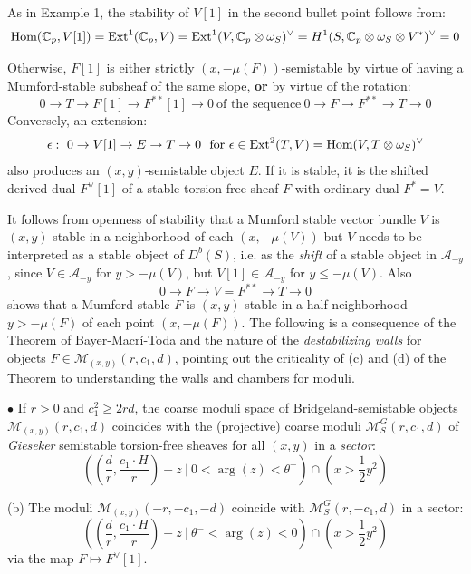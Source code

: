 \documentclass{amsart}
\begin{document}
As in Example 1, the stability of $V[1]$ in the second bullet point follows from:
\[ \mbox{Hom}({\mathbb C}_p, V[1]) = \mbox{Ext}^1({\mathbb C}_p,V) = \mbox{Ext}^1(V, {\mathbb C}_p \otimes \omega_S)^\vee = H^1(S, {\mathbb C}_p \otimes \omega_S \otimes V^*)^\vee = 0 \] 

Otherwise, $F[1]$ is either strictly $(x,-\mu(F))$-semistable by virtue of having a Mumford-stable subsheaf of the same slope, {\bf or} by 
virtue of the rotation:
\[ 0 \rightarrow T \rightarrow F[1] \rightarrow F^{**}[1] \rightarrow 0  \ \mbox{of the sequence} \  0 \rightarrow F \rightarrow F^{**} \rightarrow T \rightarrow 0 \]  
Conversely, an extension:
\[ \epsilon: \ 0 \rightarrow V[1] \rightarrow E \rightarrow T \rightarrow 0 \ \ \mbox{for} \ \epsilon \in \Ext^ 2(T,V) = \Hom(V,T \otimes \omega_S)^\vee \] 
also produces an $(x,y)$-semistable object $E$. 
If it is  stable, it is the shifted derived dual  $F^\vee[1]$ of a stable torsion-free sheaf $F$ with ordinary dual $F^* = V$. 

\medskip

It follows from openness of stability that a Mumford stable vector bundle $V$ is 
$(x,y)$-stable in a neighborhood of each $(x, -\mu(V))$ 
but $V$ needs to be interpreted as a stable object of $D^b(S)$, i.e. as the  {\it shift} of a stable object in ${\mathcal A}_{-y}$, since $V \in {\mathcal A}_{-y}$ for $y > -\mu(V)$, but 
$V[1] \in {\mathcal A}_{-y}$ for $y \le -\mu(V)$. Also
\[ 0 \rightarrow F \rightarrow V = F^{**} \rightarrow T \rightarrow 0 \] 
shows that a Mumford-stable $F$ is $(x,y)$-stable in a half-neighborhood 
$y > -\mu(F)$ of each point $(x,-\mu(F))$. The following  is a consequence of the Theorem of Bayer-Macr\'i-Toda
and the nature of the {\it destabilizing walls} for objects $F \in {\mathcal M}_{(x,y)}(r,c_1,d)$, pointing out 
the criticality of  (c) and (d) of the Theorem to understanding the walls and chambers for moduli.

\medskip

$\bullet$ If  $r > 0$ and $c_1^2 \ge 2rd$, the coarse moduli space of Bridgeland-semistable objects ${\mathcal M}_{(x,y)}(r,c_1,d)$ 
coincides with the (projective) coarse  moduli ${\mathcal M}_S^G(r,c_1,d)$ of  {\it Gieseker} semistable torsion-free sheaves for all $(x,y)$ in a {\it sector}: 
\[\left(  \left( \frac dr, \frac {c_1\cdot H}r  \right) + z \ | \ 0 < \arg(z) < \theta^+ \right) \cap \left( x > \frac 12y^2 \right) \]

(b) The moduli ${\mathcal M}_{(x,y)}(-r, -c_1, -d)$ coincide with 
${\mathcal M}^{G}_S(r,-c_1,d)$  in a sector: 
\[ \left(  \left( \frac dr, \frac{c_1\cdot H}r  \right) + z \ | \ \theta^- < \arg(z)  < 0 \right) \cap \left( x > \frac 12y^2 \right) \]
via the map $F \mapsto F^\vee[1]$. 
\end{document}
